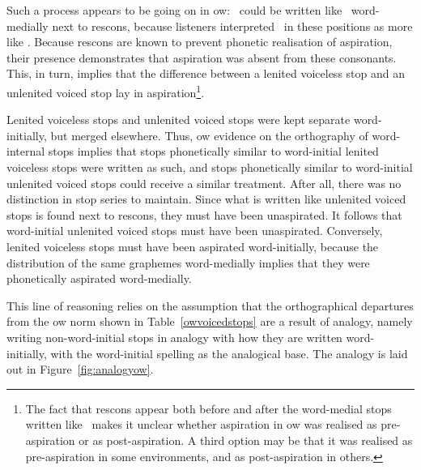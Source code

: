 Such a process appears to be going on in \gls{ow}: \lT\  could be written like \xD\ word-medially next to \gls{rescon}s, because listeners interpreted \lT\ in these positions as more like \xD. Because \gls{rescon}s are known to prevent phonetic realisation of aspiration, their presence demonstrates that  aspiration was absent from these consonants. This, in turn, implies that the difference between a lenited voiceless stop and an unlenited voiced stop lay in aspiration\footnote{The fact that \gls{rescon}s appear both before and after the word-medial stops written like \xD\ makes it unclear whether  aspiration in \gls{ow} was realised as pre-aspiration or as  post-aspiration. A third option may be that it was realised as pre-aspiration in some environments, and as post-aspiration in others.}.

Lenited voiceless stops and unlenited voiced stops were kept separate word-initially, but merged elsewhere. Thus, \gls{ow} evidence on the orthography of word-internal stops implies that stops phonetically similar to word-initial lenited voiceless stops were written as such, and stops phonetically similar to word-initial unlenited voiced stops could receive a similar treatment. After all, there was no distinction in stop series to maintain. Since what is written like unlenited voiced stops is found next to \gls{rescon}s, they must have been unaspirated. It follows that word-initial unlenited voiced stops must have been unaspirated. Conversely, lenited voiceless stops must have been aspirated  word-initially, because the distribution of the same graphemes word-medially implies that they were phonetically aspirated word-medially.

This line of reasoning relies on the assumption that the orthographical departures from the \gls{ow} norm shown in Table~\ref{owvoicedstops} are a result of analogy, namely writing non-word-initial stops in analogy with how they are written word-initially, with the word-initial spelling as the analogical base. The analogy is laid out in Figure~\ref{fig:analogyow}.

